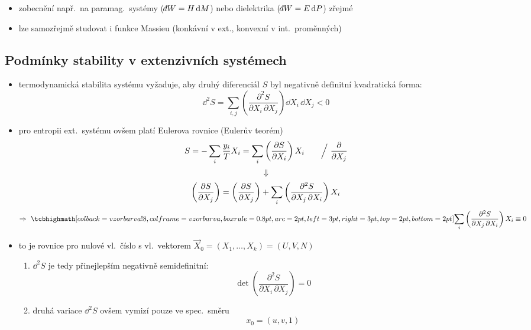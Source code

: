 \begin{itemize}
  \item zobecnění např.\ na paramag.\ systémy ($\dbar W = H\,\dd M$) nebo dielektrika ($\dbar W = E\,\dd P$) zřejmé
  \item lze samozřejmě studovat i funkce Massieu (konkávní v ext., konvexní v int.\ proměnných)
\end{itemize}

\subsection{Podmínky stability v extenzivních systémech}
\begin{itemize}
  \item termodynamická stabilita systému vyžaduje, aby druhý diferenciál $S$ byl negativně definitní kvadratická forma:
  \[ \dd^2S = \sum_{i,j}\left(\frac{\partial^2S}{\partial X_i\,\partial X_j}\right)\dd X_i\,\dd X_j < 0 \]
  \item pro entropii ext.\ systému ovšem platí Eulerova rovnice (Eulerův teorém)
  \[
    S = -\sum_i\frac{y_i}{T}X_i = \sum_i\left(\pdv{S}{X_i}\right)X_i \qquad \Big/\ \pdv{X_j}
  \]
  \[
    \Downarrow
  \]
  \[
    \left(\pdv{S}{X_j}\right) = \left(\pdv{S}{X_j}\right) + \sum_i\left(\frac{\partial^2S}{\partial X_j\,\partial X_i}\right)X_i
  \]
  \[
    \Rightarrow\ \vzorec{\sum_i\left(\frac{\partial^2S}{\partial X_j\,\partial X_i}\right)X_i \equiv 0}
  \]
  \item to je rovnice pro nulové vl.\ číslo s vl.\ vektorem $\vec X_0 = (X_1,\dots,X_k) = (U,V,N)$
  \begin{enumerate}[label=\arabic*)]
    \item $\dd^2S$ je tedy přinejlepším negativně semidefinitní:
    \[ \det\left(\frac{\partial^2S}{\partial X_i\,\partial X_j}\right) = 0 \]
    \item druhá variace $\dd^2S$ ovšem vymizí pouze ve spec.\ směru
    \[ x_0 = (u, v, 1) \]
  \end{enumerate}
\end{itemize}

